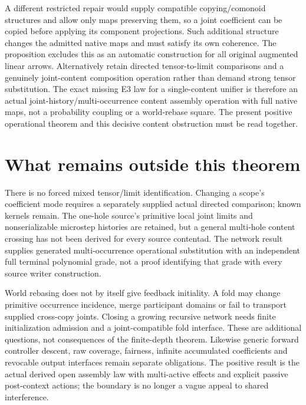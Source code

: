 \documentclass[11pt]{article}
\begin{document}
A different restricted repair would supply compatible copying/comonoid structures and allow only maps preserving them, so a joint coefficient can be copied before applying its component projections. Such additional structure changes the admitted native maps and must satisfy its own coherence. The proposition excludes this as an automatic construction for all original augmented linear arrows. Alternatively retain directed tensor-to-limit comparisons and a genuinely joint-content composition operation rather than demand strong tensor substitution. The exact missing E3 law for a single-content unifier is therefore an actual joint-history/multi-occurrence content assembly operation with full native maps, not a probability coupling or a world-rebase square. The present positive operational theorem and this decisive content obstruction must be read together.

\section{What remains outside this theorem}
There is no forced mixed tensor/limit identification. Changing a scope's coefficient mode requires a separately supplied actual directed comparison; known kernels remain. The one-hole source's primitive local joint limits and nonserializable microstep histories are retained, but a general multi-hole content crossing has not been derived for every source contentad. The network result supplies generated multi-occurrence operational substitution with an independent full terminal polynomial grade, not a proof identifying that grade with every source writer construction.

World rebasing does not by itself give feedback initiality. A fold may change primitive occurrence incidence, merge participant domains or fail to transport supplied cross-copy joints. Closing a growing recursive network needs finite initialization admission and a joint-compatible fold interface. These are additional questions, not consequences of the finite-depth theorem. Likewise generic forward controller descent, raw coverage, fairness, infinite accumulated coefficients and revocable output interfaces remain separate obligations. The positive result is the actual derived open assembly law with multi-active effects and explicit passive post-context actions; the boundary is no longer a vague appeal to shared interference.
\end{document}
